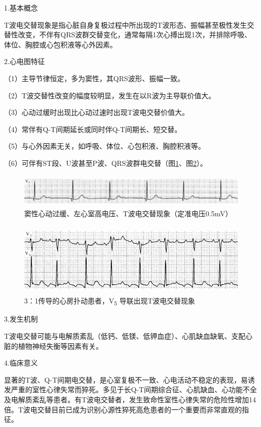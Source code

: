 1.基本概念

T波电交替现象是指心脏自身复极过程中所出现的T波形态、振幅甚至极性发生交替性改变，不伴有QRS波群交替变化，通常每隔1次心搏出现1次，并排除呼吸、体位、胸腔或心包积液等心外因素。

2.心电图特征

（1）主导节律恒定，多为窦性，其QRS波形、振幅一致。

（2）T波交替性改变的幅度较明显，发生在以R波为主导联价值大。

（3）心动过缓时出现比心动过速时出现T波电交替价值大。

（4）常伴有Q-T间期延长或同时伴Q-T间期长、短交替。

（5）与心外因素无关，如呼吸、体位、心包积液、胸腔积液等。

（6）可伴有ST段、U波甚至P波、QRS波群电交替（图\ref{fig6-14}、图\ref{fig6-15}）。

\begin{figure}[!htbp]
 \centering
 \includegraphics[width=5.78125in,height=0.64583in]{./images/Image00106.jpg}
 \captionsetup{justification=centering}
 \caption{窦性心动过缓、左心室高电压、T波电交替现象（定准电压0.5mV）}
 \label{fig6-14}
  \end{figure} 

\begin{figure}[!htbp]
 \centering
 \includegraphics[width=5.1875in,height=1.40625in]{./images/Image00107.jpg}
 \captionsetup{justification=centering}
 \caption{3：1传导的心房扑动患者，V\textsubscript{5} 导联出现T波电交替现象}
 \label{fig6-15}
  \end{figure} 

3.发生机制

T波电交替可能与电解质紊乱（低钙、低镁、低钾血症）、心肌缺血缺氧、支配心脏的植物神经失衡等因素有关。

4.临床意义

显著的T波、Q-T间期电交替，是心室复极不一致、心电活动不稳定的表现，易诱发严重的室性心律失常而猝死。多见于长Q-T间期综合征、心肌缺血、心功能不全及电解质紊乱等患者。有T波电交替者，发生致命性室性心律失常的危险性增加14倍。T波电交替目前已成为识别心源性猝死高危患者的一个重要而非常直观的指征。


